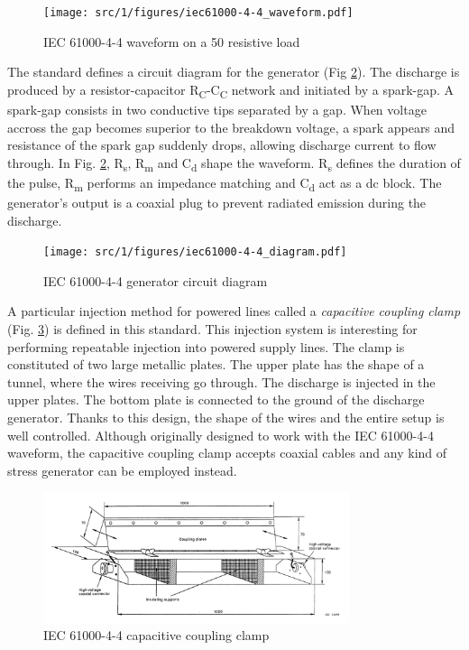 \begin{figure}[!h]
  \centering
  \texttt{[image: src/1/figures/iec61000-4-4\_waveform.pdf]}
  \caption{IEC 61000-4-4 waveform on a 50\textOmega{} resistive load}
  \label{fig:iec_4_4_pulse}
\end{figure}

The standard defines a circuit diagram for the generator (Fig \ref{fig:iec_4_4_generator}).
The discharge is produced by a resistor-capacitor R\textsubscript{C}-C\textsubscript{C} network and initiated by a spark-gap.
A spark-gap consists in two conductive tips separated by a gap.
When voltage accross the gap becomes superior to the breakdown voltage, a spark appears and resistance of the spark gap suddenly drops, allowing discharge current to flow through.
In Fig. \ref{fig:iec_4_4_generator}, R\textsubscript{s}, R\textsubscript{m} and C\textsubscript{d} shape the waveform.
R\textsubscript{s} defines the duration of the pulse, R\textsubscript{m} performs an impedance matching and C\textsubscript{d} act as a \gls{dc} block.
The generator's output is a coaxial plug to prevent radiated emission during the discharge.

\begin{figure}[!h]
  \centering
  \texttt{[image: src/1/figures/iec61000-4-4\_diagram.pdf]}
  \caption{IEC 61000-4-4 generator circuit diagram}
  \label{fig:iec_4_4_generator}
\end{figure}

A particular injection method for powered lines called a \textit{capacitive coupling clamp} (Fig. \ref{fig:iec_4_4_clamp}) is defined in this standard.
This injection system is interesting for performing repeatable injection into powered supply lines.
The clamp is constituted of two large metallic plates.
The upper plate has the shape of a tunnel, where the wires receiving go through.
The discharge is injected in the upper plates.
The bottom plate is connected to the ground of the discharge generator.
Thanks to this design, the shape of the wires and the entire setup is well controlled.
Although originally designed to work with the IEC 61000-4-4 waveform, the capacitive coupling clamp accepts coaxial cables and any kind of stress generator can be employed instead.

\begin{figure}[!h]
  \centering
  \includegraphics[width=0.8\textwidth]{src/1/figures/iec61000-4-4_clamp.png}
  \caption{IEC 61000-4-4 capacitive coupling clamp}
  \label{fig:iec_4_4_clamp}
\end{figure}

